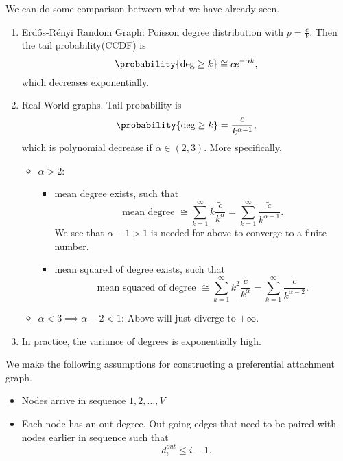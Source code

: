 \begin{remark}
	We can do some comparison between what we have already seen.
	\begin{enumerate}
		\item Erdős-Rényi Random Graph: Poisson degree distribution with \(p = \frac{c}{V}\). Then the tail probability(CCDF) is
		      \[
			      \probability{\deg\geq k}\cong c e^{-\alpha k},
		      \]
		      which decreases exponentially.
		\item Real-World graphs. Tail probability is
		      \[
			      \probability{\deg\geq k} = \frac{c}{k^{\alpha - 1}},
		      \]
		      which is polynomial decrease if \(\alpha\in(2, 3)\). More specifically,
		      \begin{itemize}
			      \item \(\alpha>2\):
			            \begin{itemize}
				            \item mean degree exists, such that
				                  \[
					                  \text{mean degree }\cong \sum\limits_{k=1}^{\infty} k \frac{\widetilde{c}}{k^{\alpha}} = \sum\limits_{k=1}^{\infty} \frac{\widetilde{c}}{k^{\alpha - 1}}.
				                  \]
				                  We see that \(\alpha - 1 > 1\) is needed for above to converge to a finite number.
				            \item mean squared of degree exists, such that
				                  \[
					                  \text{mean squared of degree }\cong \sum\limits_{k=1}^{\infty} k^2 \frac{\widetilde{c}}{k^{\alpha}} = \sum\limits_{k=1}^{\infty} \frac{\widetilde{c}}{k^{\alpha-2}}.
				                  \]
			            \end{itemize}
			      \item \(\alpha<3 \implies \alpha - 2 < 1\): Above will just diverge to \(+\infty\).
		      \end{itemize}
		\item In practice, the variance of degrees is exponentially high.
	\end{enumerate}
\end{remark}

\hr

We make the following assumptions for constructing a preferential attachment graph.
\begin{itemize}
	\item Nodes arrive in sequence \(1, 2, \ldots , V\)
	\item Each node has an out-degree. Out going edges that need to be paired with nodes earlier in sequence such that
	      \[
		      d_{i}^{out} \leq i - 1.
	      \]
\end{itemize}

